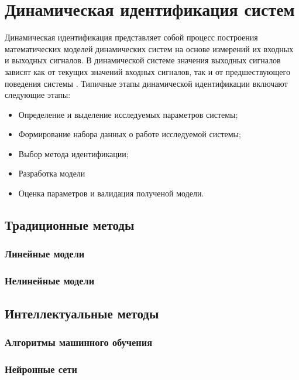 \chapter{Динамическая идентификация систем}

Динамическая идентификация представляет собой процесс построения математических
моделей динамических систем на основе измерений их входных и выходных сигналов.
В динамической системе значения выходных сигналов зависят как от текущих
значений входных сигналов, так и от предшествующего поведения системы
\cite{bb:identification}. Типичные этапы динамической идентификации включают
следующие этапы: 

\begin{itemize}
  \item Определение и выделение исследуемых параметров системы;
  \item Формирование набора данных о работе исследуемой системы;
  \item Выбор метода идентификации;
  \item Разработка модели
  \item Оценка параметров и валидация полученой модели.
\end{itemize}

\section{Традиционные методы}

\subsection{Линейные модели}

\subsection{Нелинейные модели}

\section{Интеллектуальные методы}

\subsection{Алгоритмы машинного обучения}

\subsection{Нейронные сети}

